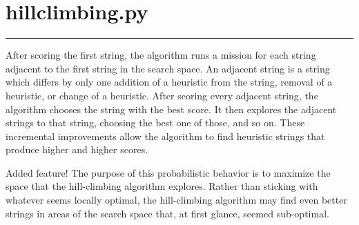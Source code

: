 \documentclass[letterpaper,10pt,english]{sphinxmanual}
\begin{document}
\label{\detokenize{index:module-algorithms.hillclimbing}}

\chapter{hillclimbing.py}
\label{\detokenize{index:hillclimbing-py}}

\bigskip\hrule\bigskip


After scoring the first string, the algorithm runs a mission for each string adjacent to the first string in the search space.
An adjacent string is a string which differs by only one addition of a heuristic from the string, removal of a heuristic, or change of a heuristic.
After scoring every adjacent string, the algorithm chooses the string with the best score. It then explores the adjacent strings to that string,
choosing the best one of those, and so on. These incremental improvements allow the algorithm to find heuristic strings that produce higher and higher scores.

Added  feature!
The purpose of this probabilistic behavior is to maximize the space that the hill-climbing algorithm explores.
Rather than sticking with whatever seems locally optimal,  the hill-climbing algorithm may find even better strings
in areas of the search space that, at first glance, seemed sub-optimal.

\begin{quote}
\begin{description}
\item[{}] \leavevmode\begin{description}
\item[{}] \leavevmode\begin{description}
\item[{}] \leavevmode
{}

\end{description}

\end{description}


\end{description}
\end{quote}
\end{document}

